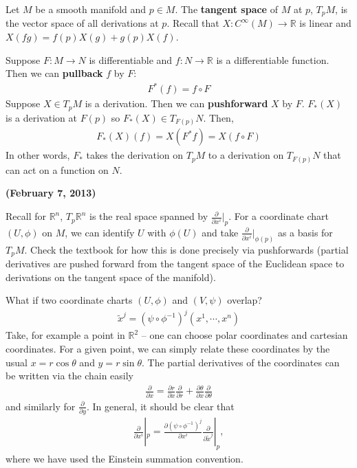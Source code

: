 \documentclass{../mathnotes}
\begin{document}
\begin{defn}
    Let $M$ be a smooth manifold and $p\in M$. The \textbf{tangent space} of $M$ at $p$, $T_pM$, is the vector space of all derivations at $p$.
    Recall that $X:C^\infty(M)\to\mathbb{R}$ is linear and $X(fg)=f(p)X(g)+g(p)X(f)$.
\end{defn}

\begin{rem}
    Suppose $F:M\to N$ is differentiable and $f: N\to \mathbb{R}$ is a differentiable function. Then we can \textbf{pullback} $f$ by $F$:
    \begin{align*}
        F^*(f)=f\circ F
    \end{align*}
    Suppose $X\in T_pM$ is a derivation. Then we can \textbf{pushforward} $X$ by $F$. $F_*(X)$ is a derivation at $F(p)$ so $F_*(X)\in T_{F(p)}N$.
    Then,
    \begin{align*}
        F_*(X)(f)=X(F^*f)=X(f\circ F)
    \end{align*}
    In other words, $F_*$ takes the derivation on $T_pM$ to a derivation on $T_{F(p)}N$ that can act on a function on $N$.
\end{rem}

\newpage

\textbf{(February 7, 2013)}

Recall for $\mathbb{R}^n$, $T_p\mathbb{R}^n$ is the real space spanned by $\frac{\partial}{\partial x^i}|_p$. For a coordinate chart $(U,\phi)$ on $M$, we can
identify $U$ with $\phi(U)$ and take $\frac{\partial}{\partial x^i}|_{\phi(p)}$ as a basis for $T_pM$. Check the textbook for how this is done precisely via
pushforwards (partial derivatives are pushed forward from the tangent space of the Euclidean space to derivations on the tangent space of the manifold).

What if two coordinate charts $(U,\phi)$ and $(V,\psi)$ overlap?
\begin{align*}
    \tilde{x}^j=(\psi\circ\phi^{-1})^j(x^1,\cdots,x^n)
\end{align*}
Take, for example a point in $\mathbb{R}^2$ -- one can choose polar coordinates and cartesian coordinates. For a given point, we can simply relate these coordinates
by the usual $x=r\cos\theta$ and $y=r\sin\theta$. The partial derivatives of the coordinates can be written via the chain easily
\begin{align*}
    \frac{\partial}{\partial x}=\frac{\partial r}{\partial x}\frac{\partial}{\partial r} + \frac{\partial \theta}{\partial x}\frac{\partial}{\partial \theta}
\end{align*}
and similarly for $\frac{\partial}{\partial y}$. In general, it should be clear that
\begin{align*}
    \frac{\partial}{\partial x^i}|_p=\frac{\partial (\psi\circ\phi^{-1})^j}{\partial x^i}\frac{\partial}{\partial \tilde{x}^j}|_p,
\end{align*}
where we have used the Einstein summation convention.
\end{document}

